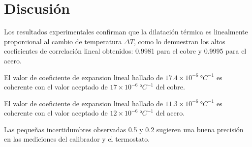 \section*{Discusi\'on}
Los resultados experimentales confirman que la dilatación térmica es linealmente proporcional al cambio de temperatura $\Delta T$, como lo demuestran los altos coeficientes de correlación lineal obtenidos: 0.9981 para el cobre y 0.9995 para el acero.

El valor de coeficiente de expansion lineal hallado de $17.4 \times 10^{-6} \ \si{\degree C}^{-1}$ es coherente con el valor aceptado de $17 \times 10^{-6} \ \si{\degree C}^{-1}$ del cobre\cite{constantes}.

El valor de coeficiente de expansion lineal hallado de $11.3 \times 10^{-6} \ \si{\degree C}^{-1}$ es coherente con el valor aceptado de $12 \times 10^{-6} \ \si{\degree C}^{-1}$ del acero\cite{constantes}.

Las pequeñas incertidumbres observadas 0.5 y 0.2 sugieren una buena precisión en las mediciones del calibrador y el termostato.
